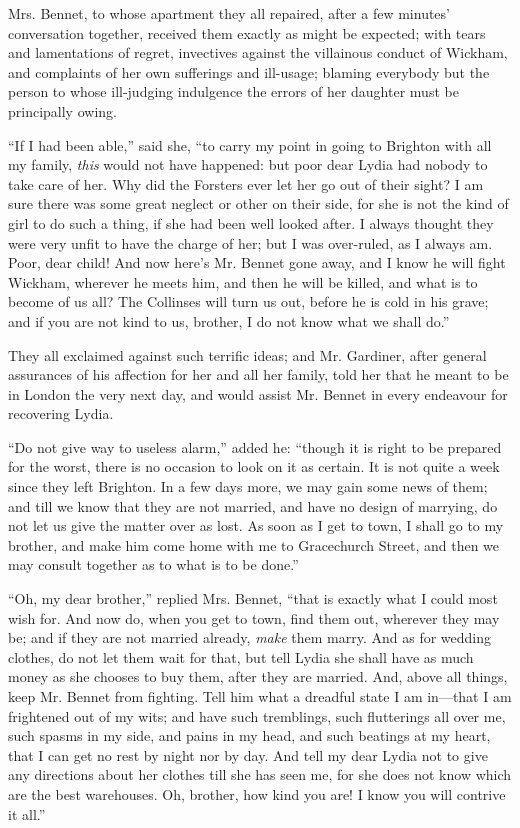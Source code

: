 \documentclass[12pt,openright]{book}
\begin{document}
Mrs. Bennet, to whose apartment they all repaired, after a few minutes’ conversation together, received them exactly as might be expected; with tears and lamentations of regret, invectives against the villainous conduct of Wickham, and complaints of her own sufferings and ill-usage; blaming everybody but the person to whose ill-judging indulgence the errors of her daughter must be principally owing.

“If I had been able,” said she, “to carry my point in going to Brighton with all my family, \textit{this} would not have happened: but poor dear Lydia had nobody to take care of her. Why did the Forsters ever let her go out of their sight? I am sure there was some great neglect or other on their side, for she is not the kind of girl to do such a thing, if she had been well looked after. I always thought they were very unfit to have the charge of her; but I was over-ruled, as I always am. Poor, dear child! And now here’s Mr. Bennet gone away, and I know he will fight Wickham, wherever he meets him, and then he will be killed, and what is to become of us all? The Collinses will turn us out, before he is cold in his grave; and if you are not kind to us, brother, I do not know what we shall do.”

They all exclaimed against such terrific ideas; and Mr. Gardiner, after general assurances of his affection for her and all her family, told her that he meant to be in London the very next day, and would assist Mr. Bennet in every endeavour for recovering Lydia.

“Do not give way to useless alarm,” added he: “though it is right to be prepared for the worst, there is no occasion to look on it as certain. It is not quite a week since they left Brighton. In a few days more, we may gain some news of them; and till we know that they are not married, and have no design of marrying, do not let us give the matter over as lost. As soon as I get to town, I shall go to my brother, and make him come home with me to Gracechurch Street, and then we may consult together as to what is to be done.”

“Oh, my dear brother,” replied Mrs. Bennet, “that is exactly what I could most wish for. And now do, when you get to town, find them out, wherever they may be; and if they are not married already, \textit{make} them marry. And as for wedding clothes, do not let them wait for that, but tell Lydia she shall have as much money as she chooses to buy them, after they are married. And, above all things, keep Mr. Bennet from fighting. Tell him what a dreadful state I am in—that I am frightened out of my wits; and have such tremblings, such flutterings all over me, such spasms in my side, and pains in my head, and such beatings at my heart, that I can get no rest by night nor by day. And tell my dear Lydia not to give any directions about her clothes till she has seen me, for she does not know which are the best warehouses. Oh, brother, how kind you are! I know you will contrive it all.”
\end{document}
